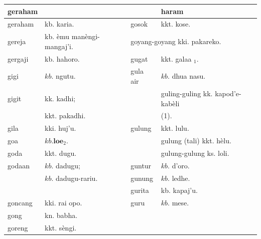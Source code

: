 \documentclass[10pt]{article}
\begin{document}
\begin{center}
\begin{tabular}{|l|l|l|l|}
\hline
geraham &  &  & haram \\
\hline
geraham & kb. karia. & gosok & kkt. kose. \\
\hline
gereja & kb. èmu manèngi-mangaj'i. & \multicolumn{2}{|l|}{goyang-goyang kki. pakareko.} \\
\hline
gergaji & kb. hahoro. & gugat & kkt. galaa \({ }_{1}\). \\
\hline
gigi & \(k b\). ngutu. & gula air & \(k b\). dhua nasu. \\
\hline
gigit & kk. kadhi; &  & guling-guling kk. kapod'e-kabèli \\
\hline
 & kkt. pakadhi. &  & (1). \\
\hline
gila & kki. huj'u. & gulung & kkt. lulu. \\
\hline
goa & \(k b . \mathbf{l o e}_{2}\). &  & gulung (tali) kkt. hèlu. \\
\hline
goda & kkt. dugu. &  & gulung-gulung ks. loli. \\
\hline
godaan & \(k b\). dadugu; & guntur & \(k b\). d'oro. \\
\hline
 & \(k b\). dadugu-rariu. & gunung & \(k b\). ledhe. \\
\hline
\multicolumn{2}{|c|}{} & gurita & kb. kapaj'u. \\
\hline
goncang & kki. rai opo. & guru & \(k b\). mese. \\
\hline
gong & kn. babha. &  &  \\
\hline
goreng & kkt. sèngi. &  &  \\
\hline
\end{tabular}
\end{center}
\end{document}
